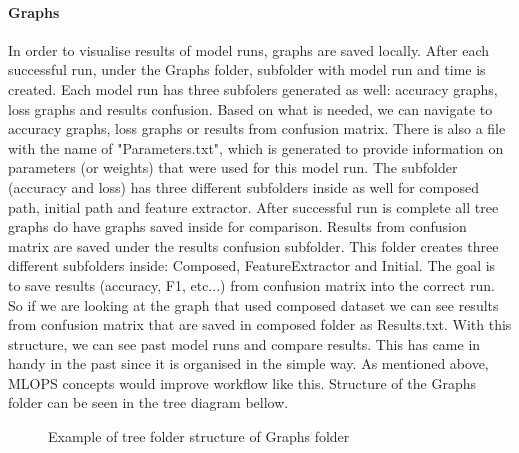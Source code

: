 \paragraph{Graphs}
In order to visualise results of model runs, graphs are saved locally. After each successful run, under the Graphs folder, subfolder with model run and time is created. Each model run has three subfolers generated as well: accuracy graphs, loss graphs and results confusion. Based on what is needed, we can navigate to accuracy graphs, loss graphs or results from confusion matrix. There is also a file with the name of "Parameters.txt", which is generated to provide information on parameters (or weights) that were used for this model run.
\newline
The subfolder (accuracy and loss) has three different subfolders inside as well for composed path, initial path and feature extractor. After successful run is complete all tree graphs do have graphs saved inside for comparison.
\newline
Results from confusion matrix are saved under the results confusion subfolder. This folder creates three different subfolders inside: Composed, FeatureExtractor and Initial. The goal is to save results (accuracy, F1, etc...) from confusion matrix into the correct run. So if we are looking at the graph that used composed dataset we can see results from confusion matrix that are saved in composed folder as Results.txt.
\newline
With this structure, we can see past model runs and compare results. This has came in handy in the past since it is organised in the simple way. As mentioned above, MLOPS concepts would improve workflow like this. Structure of the Graphs folder can be seen in the tree diagram bellow.
\newpage
\begin{figure}[!ht]
\caption{Example of tree folder structure of Graphs folder}
\end{figure}